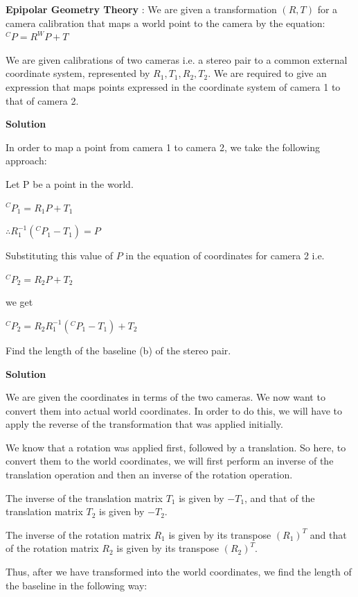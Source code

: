 \documentclass{assignment}
\date{November 7, 2016}
\begin{document}
\begin{problemlist}

\pbitem \textbf{Epipolar Geometry Theory} : We are given a transformation $(R, T)$ for a camera calibration that maps a world point to the camera by the equation: $^{C}P = R^{W}P + T$

\begin{legal}

\item We are given calibrations of two cameras i.e. a stereo pair to a common external coordinate system, represented by $R_1, T_1, R_2, T_2$. We are required to give an expression that maps points expressed in the coordinate system of camera 1 to that of camera 2.

\textbf{Solution}

In order to map a point from camera 1 to camera 2, we take the following approach:

Let P be a point in the world. 

$^{C}P_1 = R_1P + T_1$

$\therefore R_1^{-1}(^{C}P_1 - T_1) = P$

Substituting this value of $P$ in the equation of coordinates for camera 2 i.e.

$^{C}P_2 = R_2P + T_2$

we get

$^{C}P_2 = R_2R_1^{-1}(^{C}P_1 - T_1) + T_2$

\item Find the length of the baseline (b) of the stereo pair.

\textbf{Solution}

We are given the coordinates in terms of the two cameras. We now want to convert them into actual world coordinates. In order to do this, we will have to apply the reverse of the transformation that was applied initially.

We know that a rotation was applied first, followed by a translation. So here, to convert them to the world coordinates, we will first perform an inverse of the translation operation and then an inverse of the rotation operation.

The inverse of the translation matrix $T_1$ is given by $-T_1$, and that of the translation matrix $T_2$ is given by $-T_2$.

The inverse of the rotation matrix $R_1$ is given by its transpose $(R_1)^T$ and that of the rotation matrix $R_2$ is given by its transpose $(R_2)^T$.

Thus, after we have transformed into the world coordinates, we find the length of the baseline in the following way:


\end{legal}
\end{problemlist}
\end{document}
